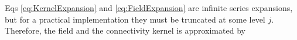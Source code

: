 \documentclass[journal,a4paper]{IEEEtran}
\begin{document}
Eqs \eqref{eq:KernelExpansion} and \eqref{eq:FieldExpansion} are infinite series expansions, but  for a practical implementation they must be truncated at some level $j$. Therefore, the field and the connectivity kernel is approximated by
\end{document}
